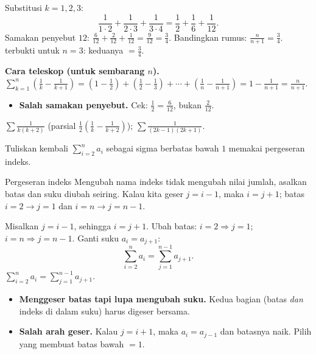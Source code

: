 \jawab
{} Substitusi $k=1,2,3$:
\[
\frac{1}{1\cdot2}+\frac{1}{2\cdot3}+\frac{1}{3\cdot4}=\frac12+\frac16+\frac{1}{12}.
\]
 Samakan penyebut $12$: $\frac{6}{12}+\frac{2}{12}+\frac{1}{12}
=\frac{9}{12}=\frac34$.
 Bandingkan rumus: $\frac{n}{n+1}=\frac{3}{4}$. \checkmark
\jadi terbukti untuk $n=3$: keduanya $=\frac34$.

\begin{tips}
\textbf{Cara teleskop (untuk sembarang $n$).}
$\sum_{k=1}^{n}\left(\frac1k-\frac1{k+1}\right)
=\left(1-\frac12\right)+\left(\frac12-\frac13\right)+\cdots+\left(\frac1n-\frac1{n+1}\right)
=1-\frac1{n+1}=\frac{n}{n+1}$.
\end{tips}

\begin{jebakan}
\begin{itemize}[leftmargin=*,topsep=2pt]
  \item \textbf{Salah samakan penyebut.} Cek: $\frac12=\frac{6}{12}$, bukan
  $\frac{2}{12}$.
\end{itemize}
\end{jebakan}

\begin{variasi}
$\sum\frac{1}{k(k+2)}$ (parsial $\frac12(\frac1k-\frac1{k+2})$);
$\sum\frac{1}{(2k-1)(2k+1)}$.
\end{variasi}

\begin{soalbox}{}
Tuliskan kembali $\displaystyle\sum_{i=2}^{n}a_i$ sebagai sigma berbatas bawah
$1$ memakai pergeseran indeks.
\end{soalbox}

\begin{ingat}{Pergeseran indeks}
Mengubah nama indeks tidak mengubah nilai jumlah, asalkan batas dan suku diubah
seiring. Kalau kita geser $j=i-1$, maka $i=j+1$; batas $i=2\to j=1$ dan $i=n\to
j=n-1$.
\end{ingat}

\jawab
{} Misalkan $j=i-1$, sehingga $i=j+1$.
 Ubah batas: $i=2\Rightarrow j=1$; $i=n\Rightarrow j=n-1$.
 Ganti suku $a_i=a_{j+1}$:
\[
\sum_{i=2}^{n}a_i=\sum_{j=1}^{n-1}a_{j+1}.
\]
\jadi $\displaystyle\sum_{i=2}^{n}a_i=\sum_{j=1}^{n-1}a_{j+1}$.

\begin{jebakan}
\begin{itemize}[leftmargin=*,topsep=2pt]
  \item \textbf{Menggeser batas tapi lupa mengubah suku.} Kedua bagian (batas
  \emph{dan} indeks di dalam suku) harus digeser bersama.
  \item \textbf{Salah arah geser.} Kalau $j=i+1$, maka $a_i=a_{j-1}$ dan batasnya
  naik. Pilih yang membuat batas bawah $=1$.
\end{itemize}
\end{jebakan}

